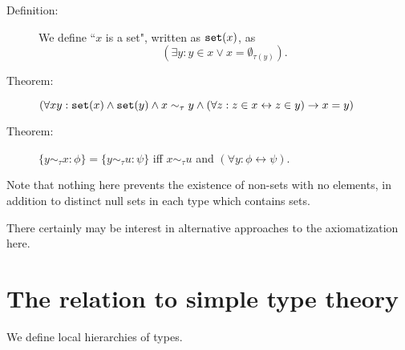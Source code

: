 \documentclass[12pt]{article}
\begin{document}
\begin{description}

\item[Definition:]  We define ``$x$ is a set", written as ${\tt set}(x)$, as $$(\exists y:y \in x \vee x = \emptyset_{\tau(y)}).$$

\item[Theorem:]  $(\forall xy:{\tt set}(x) \wedge {\tt set}(y) \wedge x \sim_\tau y \wedge (\forall z:z \in x \leftrightarrow z \in y) \rightarrow x=y)$

\item[Theorem:]  $\{y \sim_\tau x:\phi\} = \{y \sim_\tau u:\psi\}$ iff $x \sim_\tau u$ and $(\forall y:\phi \leftrightarrow \psi)$.


\end{description}

Note that nothing here prevents the existence of non-sets with no elements, in addition to distinct null sets in each type which contains sets.

There certainly may be interest in alternative approaches to the axiomatization here.


\newpage
\section{The relation to simple type theory}

We define local hierarchies of types.
\end{document}
